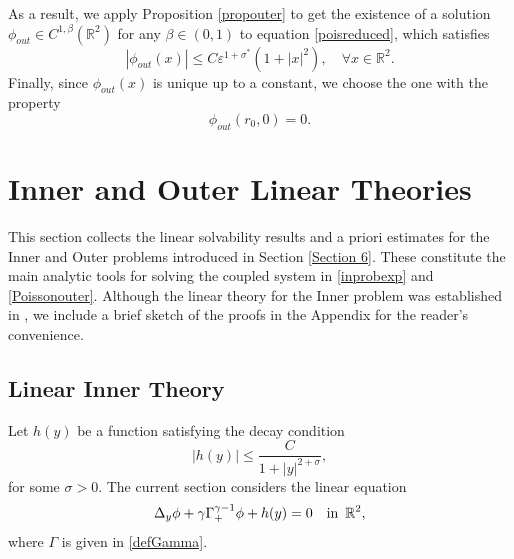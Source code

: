 \documentclass[11pt,reqno,a4paper]{amsart}
\numberwithin{equation}{section}
\newcommand{\R}{\mathbb{R}}
\newcommand{\inn}{{\quad\hbox{in } }}
\newcommand{\ve}{\varepsilon}
\newcommand{\be}{\begin{equation}}
\newcommand{\ee}{\end{equation}}
\begin{document}
As a result, we apply Proposition \ref{propouter} to get the existence of a solution $\phi_{out}\in C^{1,\beta}(\R^2)$ for any $\beta\in(0,1)$ to equation \eqref{poisreduced}, which satisfies 
\begin{equation}\label{boundphiout}
|\phi_{out}(x)|\leq C \ve^{1+\sigma^{*}}\left(1+|x|^2\right),\quad \forall x \in \R^2.
\end{equation}
Finally, since $\phi_{out}(x)$ is unique up to a constant, we choose the one with the property
\begin{equation}\label{phioutP}
\phi_{out}(r_0,0)=0.
\end{equation}
\section{Inner and Outer Linear Theories}\label{Section 7}
This section collects the linear solvability results and a priori estimates for the Inner and Outer problems introduced in Section \ref{Section 6}. These constitute the main analytic tools for solving the coupled system in \eqref{inprobexp} and \eqref{Poissonouter}. Although the linear theory for the Inner problem was established in \cite{MR5036920}, we include a brief sketch of the proofs in the Appendix for the reader's convenience.
\subsection{Linear Inner Theory}
Let $h(y)$ be a function satisfying the decay condition 
\begin{equation}\label{hdecay}
    |h(y)|\leq \frac{C}{1+|y|^{2+\sigma}},
\end{equation} for some $\sigma>0$. The current section considers the linear equation
\be\label{Linearisedinner}
\begin{aligned}
\Delta_{y} \phi + \gamma\Gamma^{\gamma-1}_{+}\phi +  h(y)= 0 \inn \, \R^2, 
\end{aligned}
\ee
where $\Gamma$ is given in \eqref{defGamma}.
\end{document}
